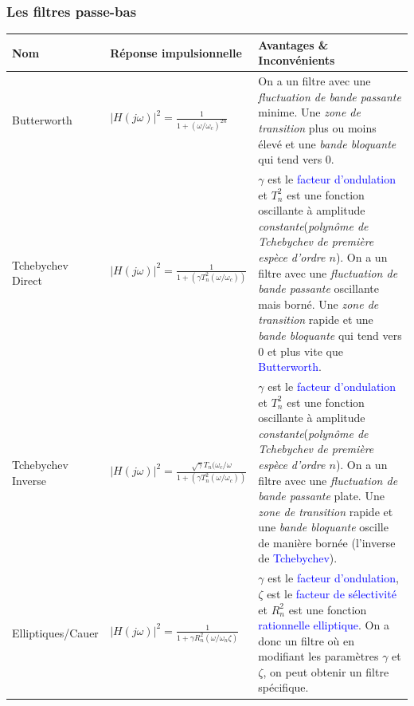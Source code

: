 \documentclass{report}
\begin{document}
\subsubsection{Les filtres passe-bas}
\begin{center}
\begin{tabular}{|m{3cm}|m{5cm}|m{7cm}|}
\hline
\cellcolor[gray]{0.8} Nom &\cellcolor[gray]{0.8} Réponse impulsionnelle & \cellcolor[gray]{0.8} Avantages \& Inconvénients\\
\hline
Butterworth & $|H(j\omega)|^2 = \frac{1}{1+(\omega/\omega_c)^{2n}}$ & On a un filtre avec une \textit{fluctuation de bande passante} minime. Une \textit{zone de transition} plus ou moins élevé et une \textit{bande bloquante} qui tend vers 0.\\
\hline
Tchebychev Direct & $|H(j\omega)|^2 = \frac{1}{1+(\gamma T_n^2 (\omega /\omega_c))}$ &$\gamma$ est le \textcolor{blue}{facteur d'ondulation} et $T_n^2$ est une fonction oscillante à amplitude \textit{constante}(\textit{polynôme de Tchebychev de première espèce d'ordre $n$}). On a un filtre avec une \textit{fluctuation de bande passante} oscillante mais borné. Une \textit{zone de transition} rapide et une \textit{bande bloquante} qui tend vers 0 et plus vite que \textcolor{blue}{Butterworth}.\\
\hline
Tchebychev Inverse & $|H(j\omega)|^2 = \frac{\sqrt{\gamma}T_n(\omega_c/\omega}{1+(\gamma T_n^2 (\omega /\omega_c))}$ &$\gamma$ est le \textcolor{blue}{facteur d'ondulation} et $T_n^2$ est une fonction oscillante à amplitude \textit{constante}(\textit{polynôme de Tchebychev de première espèce d'ordre $n$}). On a un filtre avec une \textit{fluctuation de bande passante} plate. Une \textit{zone de transition} rapide et une \textit{bande bloquante} oscille de manière bornée (l'inverse de \textcolor{blue}{Tchebychev}).\\
\hline
Elliptiques/Cauer & $|H(j\omega)|^2 = \frac{1}{1+ \gamma R_n^2(\omega / \omega_n \zeta)}$ &$\gamma$ est le \textcolor{blue}{facteur d'ondulation}, $\zeta$ est le \textcolor{blue}{facteur de sélectivité} et $R_n^2$ est une fonction \textcolor{blue}{rationnelle elliptique}. On a donc un filtre où en modifiant les paramètres $\gamma$ et $\zeta$, on peut obtenir un filtre spécifique.\\
\hline
\end{tabular}
\end{center}
\end{document}
